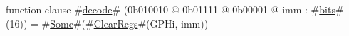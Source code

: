 function clause #\hyperref[zdecode]{decode}# (0b010010 @ 0b01111 @ 0b00001 @ imm : #\hyperref[zbits]{bits}#(16)) = #\hyperref[zSome]{Some}#(#\hyperref[zClearRegs]{ClearRegs}#(GPHi, imm))
